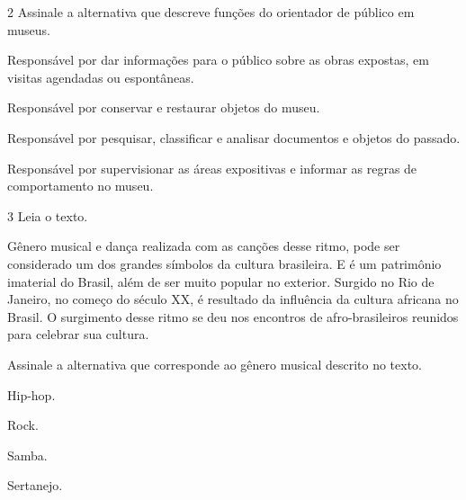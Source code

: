 \pagebreak
\num{2} Assinale a alternativa que descreve funções do orientador de público em museus.

\begin{escolha}
\item
  Responsável por dar informações para o público sobre as obras
  expostas, em visitas agendadas ou espontâneas.
\item
  Responsável por conservar e restaurar objetos do museu.
\item
  Responsável por pesquisar, classificar e analisar documentos e objetos
  do passado.
\item
  Responsável por supervisionar as áreas expositivas e informar as
  regras de comportamento no museu.
\end{escolha}


\num{3}  Leia o texto.

Gênero musical e dança realizada com as canções desse ritmo, pode ser considerado um dos
grandes símbolos da cultura brasileira. E é um patrimônio imaterial do Brasil, além de
ser muito popular no exterior. Surgido no Rio de Janeiro, no começo do século XX, é
resultado da influência da cultura africana no Brasil. O surgimento desse ritmo se deu
nos encontros de afro-brasileiros reunidos para celebrar sua cultura.

Assinale a alternativa que corresponde ao gênero musical descrito no texto.

\begin{minipage}{.5\textwidth}
\begin{escolha}
\item
  Hip-hop.
\item
  Rock.
\item
  Samba.
\item
  Sertanejo.
\end{escolha}
\end{minipage}

